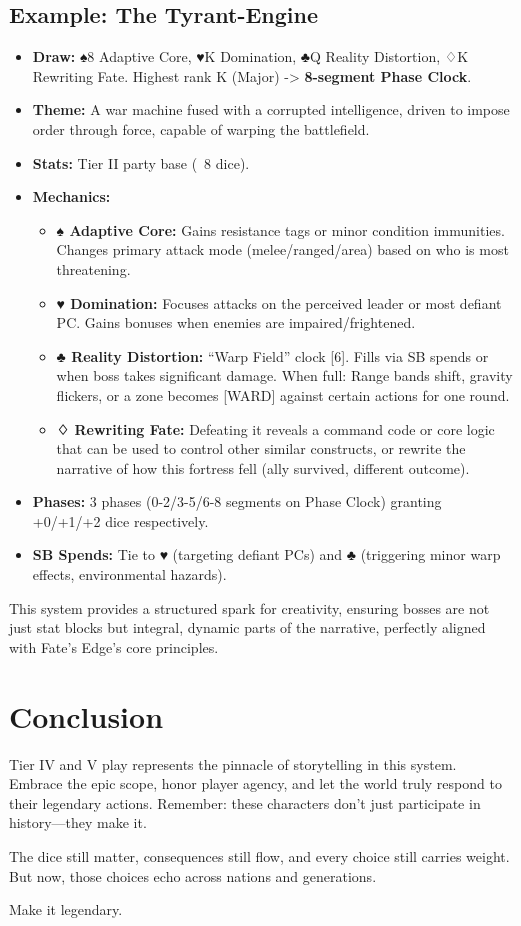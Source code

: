 \subsection{Example: The Tyrant-Engine}

\begin{itemize}
    \item \textbf{Draw:} ♠8 Adaptive Core, ♥K Domination, ♣Q Reality Distortion, ♢K Rewriting Fate. Highest rank K (Major) -> \textbf{8-segment Phase Clock}.
    \item \textbf{Theme:} A war machine fused with a corrupted intelligence, driven to impose order through force, capable of warping the battlefield.
    \item \textbf{Stats:} Tier II party base (~8 dice).
    \item \textbf{Mechanics:}
    \begin{itemize}
        \item \textbf{♠ Adaptive Core:} Gains resistance tags or minor condition immunities. Changes primary attack mode (melee/ranged/area) based on who is most threatening.
        \item \textbf{♥ Domination:} Focuses attacks on the perceived leader or most defiant PC. Gains bonuses when enemies are impaired/frightened.
        \item \textbf{♣ Reality Distortion:} ``Warp Field'' clock [6]. Fills via SB spends or when boss takes significant damage. When full: Range bands shift, gravity flickers, or a zone becomes [WARD] against certain actions for one round.
        \item \textbf{♢ Rewriting Fate:} Defeating it reveals a command code or core logic that can be used to control other similar constructs, or rewrite the narrative of how this fortress fell (ally survived, different outcome).
    \end{itemize}
    \item \textbf{Phases:} 3 phases (0-2/3-5/6-8 segments on Phase Clock) granting +0/+1/+2 dice respectively.
    \item \textbf{SB Spends:} Tie to ♥ (targeting defiant PCs) and ♣ (triggering minor warp effects, environmental hazards).
\end{itemize}

This system provides a structured spark for creativity, ensuring bosses are not just stat blocks but integral, dynamic parts of the narrative, perfectly aligned with Fate's Edge's core principles.

\section{Conclusion}

Tier IV and V play represents the pinnacle of storytelling in this system. Embrace the epic scope, honor player agency, and let the world truly respond to their legendary actions. Remember: these characters don't just participate in history---they make it.

The dice still matter, consequences still flow, and every choice still carries weight. But now, those choices echo across nations and generations.

Make it legendary.
